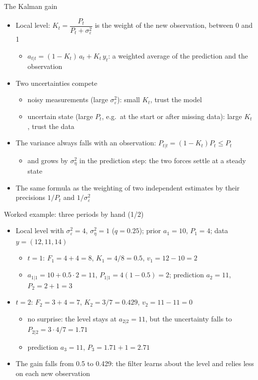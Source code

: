 \begin{frame}{The Kalman gain}
\itemsize{\small}
\begin{itemize}
    \item Local level: $K_t = \dfrac{P_t}{P_t + \sigma^2_\varepsilon}$ is the weight of the new observation, between 0 and 1
    \begin{itemize}
        \item $a_{t|t} = (1 - K_t)\,a_t + K_t\,y_t$: a weighted average of the prediction and the observation
    \end{itemize}
    \item Two uncertainties compete
    \begin{itemize}
        \item noisy measurements (large $\sigma^2_\varepsilon$): small $K_t$, trust the model
        \item uncertain state (large $P_t$, e.g.\ at the start or after missing data): large $K_t$, trust the data
    \end{itemize}
    \item The variance always falls with an observation: $P_{t|t} = (1 - K_t)P_t \le P_t$
    \begin{itemize}
        \item and grows by $\sigma^2_\eta$ in the prediction step: the two forces settle at a steady state
    \end{itemize}
    \item The same formula as the weighting of two independent estimates by their precisions $1/P_t$ and $1/\sigma^2_\varepsilon$
\end{itemize}
\end{frame}

\begin{frame}{Worked example: three periods by hand (1/2)}
\itemsize{\small}
\begin{itemize}
    \item Local level with $\sigma^2_\varepsilon = 4$, $\sigma^2_\eta = 1$ ($q = 0.25$); prior $a_1 = 10$, $P_1 = 4$; data $y = (12, 11, 14)$
    \begin{itemize}
        \item $t = 1$: $F_1 = 4 + 4 = 8$, $K_1 = 4/8 = 0.5$, $v_1 = 12 - 10 = 2$
        \item $a_{1|1} = 10 + 0.5 \cdot 2 = 11$, $P_{1|1} = 4(1 - 0.5) = 2$; prediction $a_2 = 11$, $P_2 = 2 + 1 = 3$
    \end{itemize}
    \item $t = 2$: $F_2 = 3 + 4 = 7$, $K_2 = 3/7 = 0.429$, $v_2 = 11 - 11 = 0$
    \begin{itemize}
        \item no surprise: the level stays at $a_{2|2} = 11$, but the uncertainty falls to $P_{2|2} = 3 \cdot 4/7 = 1.71$
        \item prediction $a_3 = 11$, $P_3 = 1.71 + 1 = 2.71$
    \end{itemize}
    \item The gain falls from 0.5 to 0.429: the filter learns about the level and relies less on each new observation
\end{itemize}
\end{frame}

